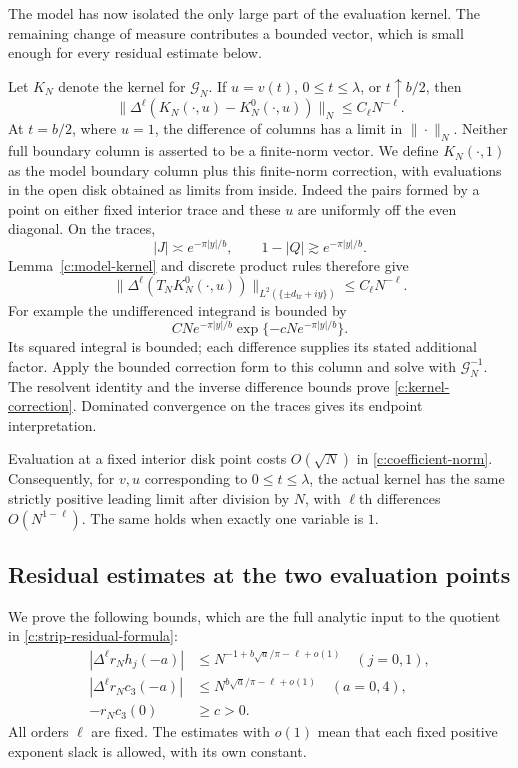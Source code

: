 \documentclass[11pt]{article}
\numberwithin{equation}{section}
\theoremstyle{definition}\newtheorem{definition}[theorem]{Definition}
\theoremstyle{remark}\newtheorem{remark}[theorem]{Remark}
\begin{document}
The model has now isolated the only large part of the evaluation
kernel.  The remaining change of measure contributes a bounded vector,
which is small enough for every residual estimate below.

Let $K_N$ denote the kernel for $\mathcal G_N$.  If
$u=v(t)$, $0\le t\le\lambda$, or $t\uparrow b/2$, then
\begin{equation}\label{c:kernel-correction}
 \|\Delta^\ell(K_N(\cdot,u)-K_N^0(\cdot,u))\|_N
 \le C_\ell N^{-\ell}.
\end{equation}
At $t=b/2$, where $u=1$, the difference of columns has a limit in
$\|\cdot\|_N$.  Neither full boundary column is asserted to be a
finite-norm vector.  We define $K_N(\cdot,1)$ as the model boundary
column plus this finite-norm correction, with evaluations in the open
disk obtained as limits from inside.
Indeed the pairs formed by a point on either fixed interior trace and
these $u$ are uniformly off the even diagonal.  On the traces,
\[
 |J|\asymp e^{-\pi|y|/b},\qquad
 1-|Q|\gtrsim e^{-\pi|y|/b}.
\]
Lemma~\ref{c:model-kernel} and discrete product rules therefore give
\[
 \|\Delta^\ell(T_NK_N^0(\cdot,u))\|_{L^2(\{\pm d_{\mathrm{tr}}+iy\})}
 \le C_\ell N^{-\ell}.
\]
For example the undifferenced integrand is bounded by
\[
 CN e^{-\pi|y|/b}\exp\{-cNe^{-\pi|y|/b}\}.
\]
Its squared integral is bounded; each difference supplies its stated additional
factor.  Apply the bounded correction form to this column and solve
with $\mathcal G_N^{-1}$.  The resolvent identity and the inverse
difference bounds prove \eqref{c:kernel-correction}.  Dominated
convergence on the traces gives its endpoint interpretation.

Evaluation at a fixed interior disk point costs $O(\sqrt N)$ in
\eqref{c:coefficient-norm}.  Consequently, for $v,u$ corresponding to
$0\le t\le\lambda$, the actual kernel has the same strictly positive
leading limit after division by $N$, with $\ell$th differences
$O(N^{1-\ell})$.  The same holds when exactly one variable is $1$.

\subsection{Residual estimates at the two evaluation points}

We prove the following bounds, which are the full analytic input to the
quotient in \eqref{c:strip-residual-formula}:
\begin{equation}\label{c:residual-estimates}
 \begin{split}
 |\Delta^\ell r_Nh_j(-a)|
     &\le N^{-1+b\sqrt a/\pi-\ell+o(1)}\quad(j=0,1),\\
 |\Delta^\ell r_Nc_3(-a)|
     &\le N^{b\sqrt a/\pi-\ell+o(1)}\quad(a=0,4),\\
 -r_Nc_3(0)&\ge c>0.
 \end{split}
\end{equation}
All orders $\ell$ are fixed.  The estimates with $o(1)$ mean that
each fixed positive exponent slack is allowed, with its own constant.
\end{document}
